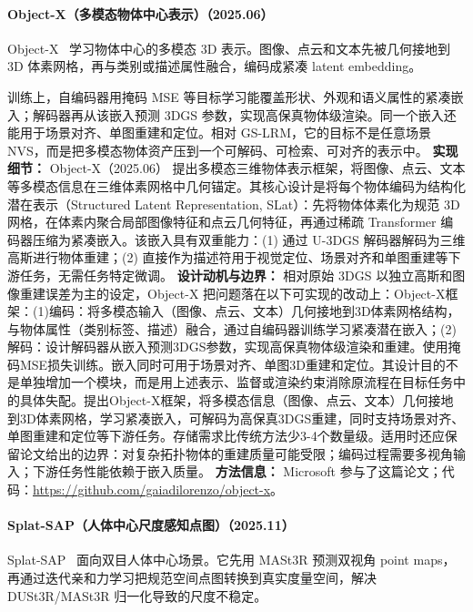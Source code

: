 \paragraph{Object-X（多模态物体中心表示）（2025.06）}
Object-X~\cite{2506_04789} 学习物体中心的多模态 3D 表示。图像、点云和文本先被几何接地到 3D 体素网格，再与类别或描述属性融合，编码成紧凑 latent embedding。

训练上，自编码器用掩码 MSE 等目标学习能覆盖形状、外观和语义属性的紧凑嵌入；解码器再从该嵌入预测 3DGS 参数，实现高保真物体级渲染。同一个嵌入还能用于场景对齐、单图重建和定位。相对 GS-LRM，它的目标不是任意场景 NVS，而是把多模态物体资产压到一个可解码、可检索、可对齐的表示中。
\textbf{实现细节：} Object-X（2025.06） 提出多模态三维物体表示框架，将图像、点云、文本等多模态信息在三维体素网格中几何锚定。其核心设计是将每个物体编码为结构化潜在表示（Structured Latent Representation, SLat）：先将物体体素化为规范 3D 网格，在体素内聚合局部图像特征和点云几何特征，再通过稀疏 Transformer 编码器压缩为紧凑嵌入。该嵌入具有双重能力：(1) 通过 U-3DGS 解码器解码为三维高斯进行物体重建；(2) 直接作为描述符用于视觉定位、场景对齐和单图重建等下游任务，无需任务特定微调。
\textbf{设计动机与边界：} 相对原始 3DGS 以独立高斯和图像重建误差为主的设定，Object-X 把问题落在以下可实现的改动上：Object-X框架：(1)编码：将多模态输入（图像、点云、文本）几何接地到3D体素网格结构，与物体属性（类别标签、描述）融合，通过自编码器训练学习紧凑潜在嵌入；(2)解码：设计解码器从嵌入预测3DGS参数，实现高保真物体级渲染和重建。使用掩码MSE损失训练。嵌入同时可用于场景对齐、单图3D重建和定位。其设计目的不是单独增加一个模块，而是用上述表示、监督或渲染约束消除原流程在目标任务中的具体失配。提出Object-X框架，将多模态信息（图像、点云、文本）几何接地到3D体素网格，学习紧凑嵌入，可解码为高保真3DGS重建，同时支持场景对齐、单图重建和定位等下游任务。存储需求比传统方法少3-4个数量级。适用时还应保留论文给出的边界：对复杂拓扑物体的重建质量可能受限；编码过程需要多视角输入；下游任务性能依赖于嵌入质量。
\textbf{方法信息：} Microsoft 参与了这篇论文；代码：\url{https://github.com/gaiadilorenzo/object-x}。



\paragraph{Splat-SAP（人体中心尺度感知点图）（2025.11）}
Splat-SAP~\cite{2511_22704} 面向双目人体中心场景。它先用 MASt3R 预测双视角 point maps，再通过迭代亲和力学习把规范空间点图转换到真实度量空间，解决 DUSt3R/MASt3R 归一化导致的尺度不稳定。

